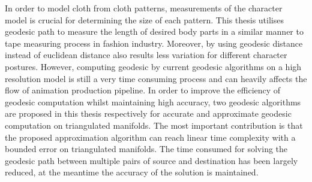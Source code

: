 In order to model cloth from cloth patterns, measurements of the character model is crucial for determining the size of each pattern. This thesis utilises geodesic path to measure the length of desired body parts in a  similar manner to tape measuring process in fashion industry. Moreover, by using geodesic distance instead of euclidean distance also results less variation for different character postures. However, computing geodesic by current geodesic algorithms on a high resolution model is still a very time consuming process and can heavily affects the flow of animation production pipeline. In order to improve the efficiency of geodesic computation whilst maintaining high accuracy, two geodesic algorithms are proposed in this thesis respectively for accurate and approximate geodesic computation on triangulated manifolds. The most important contribution is that the proposed approximation algorithm can reach linear time complexity with a bounded error on triangulated manifolds. The time consumed for solving the geodesic path between multiple pairs of source and destination has been largely reduced, at the meantime the accuracy of the solution is maintained. 



